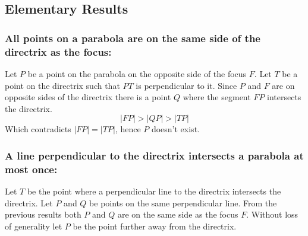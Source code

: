 \subsection{Elementary Results}
\subsubsection{All points on a parabola are on the same side of the directrix as the focus:}
\begin{center}
\end{center}
Let $P$ be a point on the parabola on the opposite side of the focus $F$.
Let $T$ be a point on the directrix such that $PT$ is perpendicular to it.
Since $P$ and $F$ are on opposite sides of the directrix there is a point $Q$ where the segment $FP$ intersects the directrix.
\[|FP| > |QP| > |TP|\]
Which contradicts $|FP|=|TP|$,
hence $P$ doesn't exist.

\subsubsection{A line perpendicular to the directrix intersects a parabola at most once:}
\begin{center}
\end{center}
Let $T$ be the point where a perpendicular line to the directrix intersects the directrix.
Let $P$ and $Q$ be points on the same perpendicular line.
From the previous results both $P$ and $Q$ are on the same side as the focus $F$.
Without loss of generality let $P$ be the point further away from the directrix.
\\

